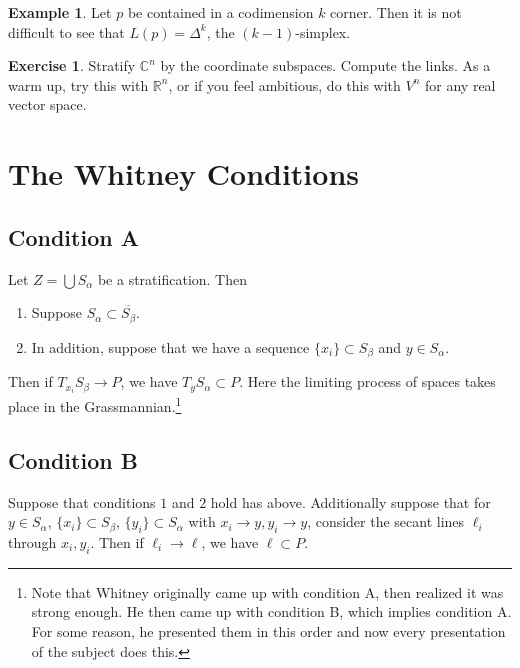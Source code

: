 \documentclass[leqno, openany]{memoir}
\theoremstyle{definition}
\newtheorem{exm}[thm]{Example}
\newtheorem{exer}[thm]{Exercise}
\theoremstyle{remark}
\theoremstyle{plain}
\theoremstyle{definition}
\theoremstyle{remark}
\newcommand{\R}{\mathbb{R}}
\newcommand{\C}{\mathbb{C}}
\begin{document}
\begin{exm}
    Let $p$ be contained in a codimension $k$ corner. Then it is not difficult to see that $L(p) = \Delta^k$, the $(k-1)$-simplex.
\end{exm}

\begin{exer}
    Stratify $\C^n$ by the coordinate subspaces. Compute the links. As a warm up, try this with $\R^n$, or if you feel ambitious, do this with $V^n$ for any real vector space.
\end{exer}

\section{The Whitney Conditions}%
\label{sec:the_whitney_conditions}

\subsection{Condition A}%
\label{sub:condition_a}

Let $Z = \bigcup S_{\alpha}$ be a stratification. Then

\begin{enumerate}
    \item Suppose $S_{\alpha} \subset \overline{S_{\beta}}$. 
    \item In addition, suppose that we have a sequence $\{x_i \} \subset S_{\beta}$ and $y \in S_{\alpha}$. 
\end{enumerate}

Then if $T_{x_i}S_{\beta} \to P$, we have $T_yS_{\alpha} \subset P$. Here the limiting process of spaces takes place in the Grassmannian.\footnote{Note that Whitney originally came up with condition A, then realized it was strong enough. He then came up with condition B, which implies condition A. For some reason, he presented them in this order and now every presentation of the subject does this.}

\subsection{Condition B}%
\label{sub:condition_b}

Suppose that conditions $1$ and $2$ hold has above. Additionally suppose that for $y \in S_{\alpha}$, $\{ x_i \} \subset S_{\beta}$, $\{ y_i \} \subset S_{\alpha}$ with $x_i \to y, y_i \to y$, consider the secant lines $\ell_i$ through $x_i, y_i$. Then if $\ell_i \to \ell$, we have $\ell \subset P$.
\end{document}
